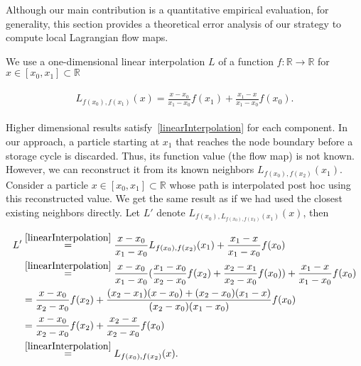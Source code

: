 \setlength{\abovedisplayskip}{0pt}
\setlength{\belowdisplayskip}{0pt}
%
Although our main contribution is a quantitative empirical evaluation, for generality, this section provides a theoretical error analysis of our strategy to compute local Lagrangian flow maps.
%

We use a one-dimensional linear interpolation $L$ of a function $f:\mathbb R\to \mathbb R$ for $x\in[x_0,x_1]\subset\mathbb R$
%
\begin{footnotesize}
\begin{eqnarray}
\begin{aligned}\label{linearInterpolation}
L_{f(x_0),f(x_1)}(x) = \frac{x-x_0}{x_1-x_0}f(x_1) + \frac{x_1-x}{x_1-x_0}f(x_0).
\end{aligned}
\end{eqnarray}
\end{footnotesize}
%
Higher dimensional results satisfy~\eqref{linearInterpolation} for each component.
In our approach, a particle starting at $x_1$ that reaches the node boundary before a storage cycle is discarded.
%
Thus, its function value (the flow map) is not known. 
%
However, we can reconstruct it from its known neighbors $L_{f(x_0),f(x_2)}(x_1)$. 
%
Consider a particle $x\in[x_0,x_1]\subset\mathbb R$ whose path is interpolated post hoc using this reconstructed value. 
%
We get the same result as if we had used the closest existing neighbors directly. Let $L'$ denote $L_{f(x_0),L_{f(x_0),f(x_2)}(x_1)}(x)$, then
%
\begin{footnotesize}
\begin{eqnarray}
\begin{aligned}\label{doubleInterpolation}
L' &\overset{\eqref{linearInterpolation}}= \frac{x-x_0}{x_1-x_0}L_{f(x_0),f(x_2)}(x_1) + \frac{x_1-x}{x_1-x_0}f(x_0)\\
&\overset{\eqref{linearInterpolation}}= \frac{x-x_0}{x_1-x_0}(\frac{x_1-x_0}{x_2-x_0}f(x_2) + \frac{x_2-x_1}{x_2-x_0}f(x_0)) + \frac{x_1-x}{x_1-x_0}f(x_0)\\
&= \frac{x-x_0}{x_2-x_0}f(x_2) + \frac{(x_2-x_1)(x-x_0)+(x_2-x_0)(x_1-x)}{(x_2-x_0)(x_1-x_0)} f(x_0)\\
&= \frac{x-x_0}{x_2-x_0}f(x_2) + \frac{x_2-x}{x_2-x_0}f(x_0)\\
&\overset{\eqref{linearInterpolation}}= L_{f(x_0),f(x_2)}(x).
\end{aligned}
\end{eqnarray}
\end{footnotesize}
